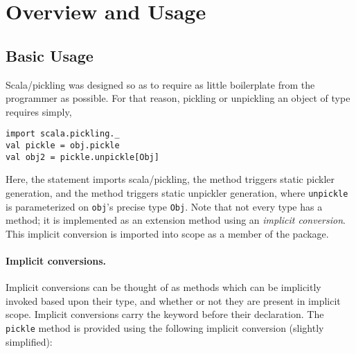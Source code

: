 


\section{Overview and Usage}
\label{sec:overview}

\subsection{Basic Usage}

Scala/pickling was designed so as to require as little
boilerplate from the programmer as possible. For that reason, pickling or
unpickling an object  of type  requires simply,

\begin{lstlisting}
import scala.pickling._
val pickle = obj.pickle
val obj2 = pickle.unpickle[Obj]
\end{lstlisting}

Here, the  statement imports scala/pickling, the method
 triggers static pickler generation, and the method
 triggers static unpickler generation, where \verb|unpickle| is
parameterized on \verb|obj|'s precise type \verb|Obj|. Note that not every
type has a  method; it is implemented as an extension method
using an {\em implicit conversion}. This implicit conversion is imported into
scope as a member of the  package.

\paragraph{Implicit conversions.} Implicit conversions can be thought of as
methods which can be implicitly invoked based upon their type, and whether or
not they are present in implicit scope. Implicit conversions carry the
 keyword before their declaration. The \verb|pickle| method is
provided using the following implicit conversion (slightly simplified):

